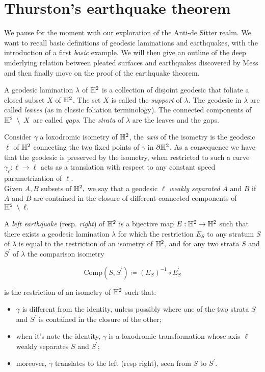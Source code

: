 \chapter{Thurston's earthquake theorem}

We pause for the moment with our exploration of the Anti-de Sitter realm. We want to recall basic definitions of geodesic laminations and earthquakes, with the introduction of a first \textit{basic} example. We will then give an outline of the deep underlying relation between pleated surfaces and earthquakes discovered by Mess and then finally move on the proof of the earthquake theorem. 

\begin{definition}
    A geodesic lamination $\lambda$ of $\mathbb{H}^2$ is a collection of disjoint geodesic that foliate a closed subset $X$ of $\mathbb{H}^2$. The set $X$ is called the \textit{support} of $\lambda.$ The geodesic in $\lambda$ are called \textit{leaves} (as in classic foliation terminology). The connected components of $\mathbb{H}^2\;\setminus\;X$ are called \textit{gaps}. The \textit{strata} of $\lambda$ are the leaves and the gaps.
\end{definition}

\noindent Consider $\gamma$ a loxodromic isometry of $\mathbb{H}^2$, the \textit{axis} of the isometry is the geodesic $\ell$ of $\mathbb{H}^2$ connecting the two fixed points of $\gamma$ in $\partial\mathbb{H}^2$. As a consequence we have that the geodesic is preserved by the isometry, when restricted to such a curve $\gamma_\ell:\ell\to\ell$ acts as a translation with respect to any constant speed parametrization of $\ell$.\\
Given $A,B$ subsets of $\mathbb{H}^2,$ we say that a geodesic $\ell$ \textit{weakly separated} $A$ and $B$ if $A$ and $B$ are contained in the closure of different connected components of $\mathbb{H}^2\;\setminus\;\ell.$ 

\begin{definition}
    A \textit{left earthquake} (resp. \textit{right}) of $\mathbb{H}^2$ is a bijective map $E:\mathbb{H}^2\to\mathbb{H}^2$ such that there exists a geodesic lamination $\lambda$ for which the restriction $E_S$ to any stratum $S$ of $\lambda$ is equal to the restriction of an isometry of $\mathbb{H}^2,$ and for any two strata $S$ and $S^{\prime}$ of $\lambda$ the comparison isometry 
    
    \[
        \text{Comp}(S,S^{\prime})\coloneqq (E_S)^{-1}\circ E_S^{\prime}
    \]

    is the restriction of an isometry of $\mathbb{H}^2$ such that:
    \begin{itemize}
        \item $\gamma$ is different from the identity, unless possibly where one of the two strata $S$ and $S^{\prime}$ is contained in the closure of the other;
        \item when it's note the identity, $\gamma$ is a loxodromic transformation whose axis $\ell$ weakly separates $S$ and $S^{\prime};$
        \item moreover, $\gamma$ translates to the left (resp right), seen from $S$ to $S^{\prime}$. 
    \end{itemize}
\end{definition}

